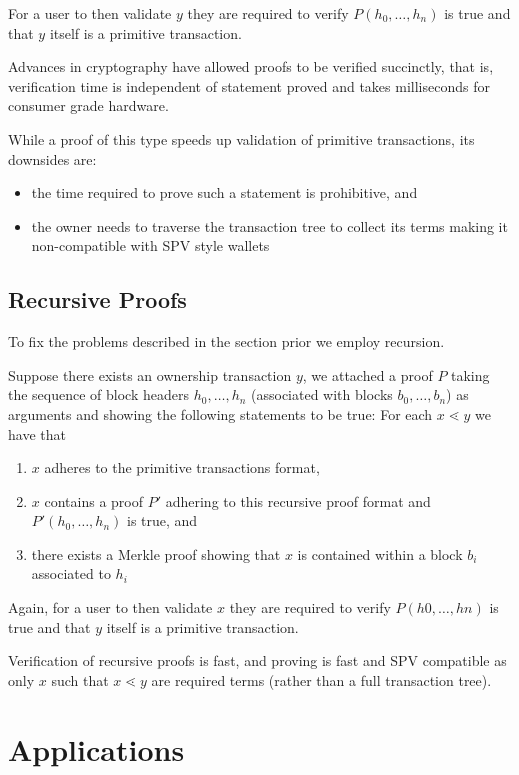 \documentclass[9pt,oneside]{amsart}
\begin{document}
For a user to then validate $y$ they are required to verify $P(h_{0}, \dots, h_{n})$ is true and that $y$ itself is a primitive transaction.

Advances in cryptography have allowed proofs to be verified succinctly, that is, verification time is independent of statement proved and takes milliseconds for consumer grade hardware.

While a proof of this type speeds up validation of primitive transactions, its downsides are:
\begin{itemize}
    \item the time required to prove such a statement is prohibitive, and
    \item the owner needs to traverse the transaction tree to collect its terms making it non-compatible with SPV style wallets
\end{itemize}

\subsection{Recursive Proofs}
To fix the problems described in the section prior we employ recursion. 

Suppose there exists an ownership transaction $y$, we attached a proof $P$ taking the sequence of block headers $h_{0}, \dots, h_{n}$ (associated with blocks $b_{0}, \dots, b_{n}$) as arguments and showing the following statements to be true:
For each $x \lessdot y$ we have that
\begin{enumerate}
    \item $x$ adheres to the primitive transactions format,
    \item $x$ contains a proof $P'$ adhering to this recursive proof format and $P'(h_{0}, \dots, h_{n})$ is true, and
    \item there exists a Merkle proof showing that $x$ is contained within a block $b_{i}$ associated to $h_{i}$
\end{enumerate}

Again, for a user to then validate $x$ they are required to verify $P(h{0}, \dots, h{n})$ is true and that $y$ itself is a primitive transaction.

Verification of recursive proofs is fast, and proving is fast and SPV compatible as only $x$ such that $x \lessdot y$ are required terms (rather than a full transaction tree).

\section{Applications}
\end{document}
